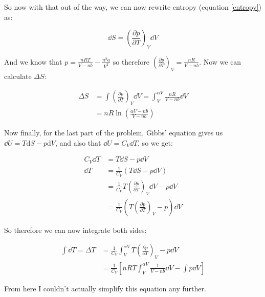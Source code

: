 \documentclass[10pt]{article}
\begin{document}
\begin{solution}
    So now with that out of the way, we can now rewrite entropy (equation \ref{entropy}) as:

    \[ \dd S  = \left(\frac{\partial p}{\partial T}\right)_V \dd V\] 

    And we know that $p = \frac{nRT}{V - nb} - \frac{n^2a}{V^2}$ so therefore $\left(\frac{\partial p}{\partial T}\right)_V = \frac{nR}{V - nb}$. Now we can calculate $\Delta S$: 

    \begin{align*}
        \Delta S &= \int \left(\frac{\partial p}{\partial T}\right)_V \dd V = \int_{V}^{\alpha V} \frac{nR}{V - nb} \dd V\\
        &= nR \ln\left(\frac{\alpha V - nb}{V - nb}\right)
    \end{align*}

    Now finally, for the last part of the problem, Gibbs' equation gives us $\dd U = T \mathrm{d}S - p\mathrm{d}V$, and also that $\dd U = C_V \dd T$, so we get:
    
    
    \begin{align*}
        C_V \dd T &= T \dd S - p \dd V\\
        \dd T &= \frac{1}{C_V} \left(T \dd S - p \dd V\right)\\
        &= \frac{1}{C_V} T \left(\frac{\partial p}{\partial T}\right)_V \dd V - p \dd V\\
        &= \frac{1}{C_V}\left(T \left(\frac{\partial p}{\partial T}\right)_V - p\right) \dd V
    \end{align*}

    So therefore we can now integrate both sides:

        \begin{align*}
            \int \dd T = \Delta T &= \frac{1}{C_V} \int_{V}^{\alpha V} T \left(\frac{\partial p}{\partial T}\right)_V -p \dd V\\
            &= \frac{1}{C_V}\left[ nRT \int_V^{\alpha V} \frac{1}{V - nb} \dd V - \int p \dd V\right]
        \end{align*}   
        
        From here I couldn't actually simplify this equation any further.
    
\end{solution}

\pagebreak
\end{document}
